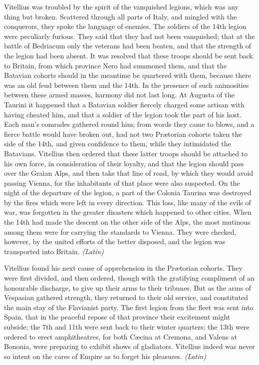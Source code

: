 
Vitellius was troubled by the spirit of the vanquished legions, which was any thing but broken. Scattered through all parts of Italy, and mingled with the conquerors, they spoke the language of enemies. The soldiers of the 14th legion were peculiarly furious. They said that they had not been vanquished; that at the battle of Bedriacum only the veterans had been beaten, and that the strength of the legion had been absent. It was resolved that these troops should be sent back to Britain, from which province Nero had summoned them, and that the Batavian cohorts should in the meantime be quartered with them, because there was an old feud between them and the 14th. In the presence of such animosities between these armed masses, harmony did not last long. At Augusta of the Taurini it happened that a Batavian soldier fiercely charged some artisan with having cheated him, and that a soldier of the legion took the part of his host. Each man's comrades gathered round him; from words they came to blows, and a fierce battle would have broken out, had not two Prætorian cohorts taken the side of the 14th, and given confidence to them, while they intimidated the Batavians. Vitellius then ordered that these latter troops should be attached to his own force, in consideration of their loyalty, and that the legion should pass over the Graian Alps, and then take that line of road, by which they would avoid passing Vienna, for the inhabitants of that place were also suspected. On the night of the departure of the legion, a part of the Colonia Taurina was destroyed by the fires which were left in every direction. This loss, like many of the evils of war, was forgotten in the greater disasters which happened to other cities. When the 14th had made the descent on the other side of the Alps, the most mutinous among them were for carrying the standards to Vienna. They were checked, however, by the united efforts of the better disposed, and the legion was transported into Britain. \emph{(Latin)}


Vitellius found his next cause of apprehension in the Prætorian cohorts. They were first divided, and then ordered, though with the gratifying compliment of an honourable discharge, to give up their arms to their tribunes. But as the arms of Vespasian gathered strength, they returned to their old service, and constituted the main stay of the Flavianist party. The first legion from the fleet was sent into Spain, that in the peaceful repose of that province their excitement might subside; the 7th and 11th were sent back to their winter quarters; the 13th were ordered to erect amphitheatres, for both Cæcina at Cremona, and Valens at Bononia, were preparing to exhibit shows of gladiators. Vitellius indeed was never so intent on the cares of Empire as to forget his pleasures. \emph{(Latin)}

